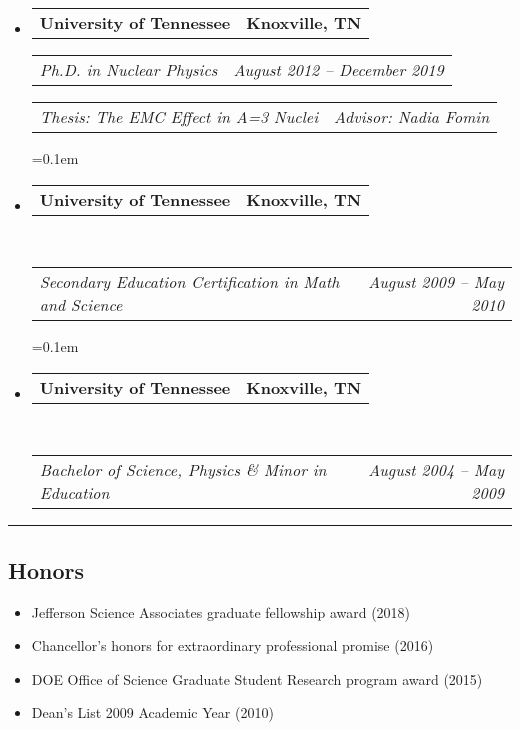 \documentclass[12pt,letterpaper]{article}
\makeatletter
\newcommand{\headerrow}[2]
{\begin{tabular*}{\linewidth}{l@{\extracolsep{\fill}}r}
	#1 &
	#2 \\
\end{tabular*}}
\makeatother
\begin{document}
\begin{itemize}
	\parskip=0.1em
	
	\item 
	\headerrow
	{\textbf{University of Tennessee}}
	{\textbf{Knoxville, TN}}
	
	\headerrow
	{\emph{Ph.D. in Nuclear Physics}}
	{\emph{August 2012 -- December 2019}}
		\headerrow
	{\emph{Thesis: The EMC Effect in A=3 Nuclei}}
	{\emph{Advisor: Nadia Fomin}}
	
	
	\parskip=0.1em
	
	\item 
	\headerrow
	{\textbf{University of Tennessee}}
	{\textbf{Knoxville, TN}}
	\\
	\headerrow
	{\emph{Secondary Education Certification in Math and Science}}
	{\emph{August 2009 -- May 2010}}
	
	
	\parskip=0.1em
	
	\item 
	\headerrow
	{\textbf{University of Tennessee}}
	{\textbf{Knoxville, TN}}
	\\
	\headerrow
	{\emph{Bachelor of Science, Physics \& Minor in Education }}
	{\emph{August 2004 -- May 2009}}
	
	
\end{itemize}
\hrule
\subsection*{Honors}
\begin{itemize}
	\item Jefferson Science Associates graduate fellowship award (2018)  
	\item Chancellor’s honors for extraordinary professional promise (2016) 
	\item DOE Office of Science Graduate Student Research program award (2015)
	\item Dean's List 2009 Academic Year (2010)
\end{itemize}
\end{document}
